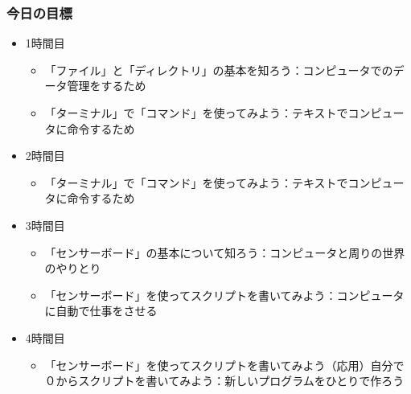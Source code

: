 \begin{frame}
    \frametitle{今日の目標} 
    \begin{itemize}
        \item 1時間目
        \begin{itemize}
            \item 「ファイル」と「ディレクトリ」の基本を知ろう：コンピュータでのデータ管理をするため
            \item 「ターミナル」で「コマンド」を使ってみよう：テキストでコンピュータに命令するため
        \end{itemize}
        \item 2時間目
        \begin{itemize}
            \item 「ターミナル」で「コマンド」を使ってみよう：テキストでコンピュータに命令するため
        \end{itemize}
        \item 3時間目
        \begin{itemize}
            \item 「センサーボード」の基本について知ろう：コンピュータと周りの世界のやりとり
            \item 「センサーボード」を使ってスクリプトを書いてみよう：コンピュータに自動で仕事をさせる
        \end{itemize}
        \item 4時間目
        \begin{itemize}
            \item 「センサーボード」を使ってスクリプトを書いてみよう（応用）自分で０からスクリプトを書いてみよう：新しいプログラムをひとりで作ろう
        \end{itemize}
    \end{itemize}
\end{frame}

